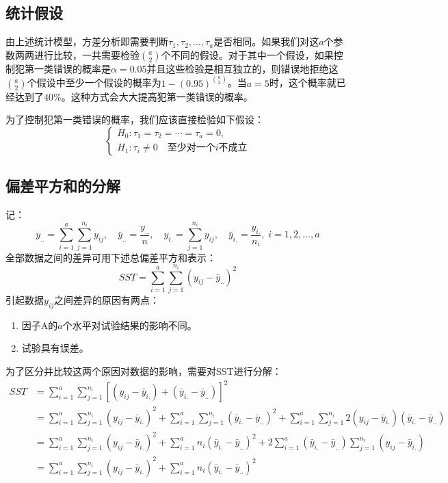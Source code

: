 \subsection{统计假设}\label{reason for multi-comparison}
由上述统计模型，方差分析即需要判断$\tau_1,\tau_2,\dots,\tau_a$是否相同。如果我们对这$a$个参数两两进行比较，一共需要检验$\binom{a}{2}$个不同的假设。对于其中一个假设，如果控制犯第一类错误的概率是$\alpha=0.05$并且这些检验是相互独立的，则错误地拒绝这$\binom{a}{2}$个假设中至少一个假设的概率为$1-(0.95)^\binom{a}{2}$。当$a=5$时，这个概率就已经达到了$40\%$。这种方式会大大提高犯第一类错误的概率。\par
为了控制犯第一类错误的概率，我们应该直接检验如下假设：
\begin{equation*}
	\begin{cases}
		H_0:\tau_1=\tau_2=\cdots=\tau_a=0, \\
		H_1:\tau_i\ne 0\quad\text{至少对一个$i$不成立}
	\end{cases}
\end{equation*}

\subsection{偏差平方和的分解}
记：
\begin{equation*}
	y_{..}=\sum_{i=1}^a\sum_{j=1}^{n_i}y_{ij},\quad\bar{y}_{..}=\frac{y_{..}}{n},\quad y_{i.}=\sum_{j=1}^{n_i}y_{ij},\quad \bar{y}_{i.}=\frac{y_{i.}}{n_i},\;i=1,2,\dots,a
\end{equation*}
全部数据之间的差异可用下述总偏差平方和表示：
\begin{equation*}
	SST=\sum_{i=1}^a\sum_{j=1}^{n_i}(y_{ij}-\bar{y}_{..})^2
\end{equation*}
引起数据$y_{ij}$之间差异的原因有两点：
\begin{enumerate}
	\item 因子A的$a$个水平对试验结果的影响不同。
	\item 试验具有误差。
\end{enumerate}
为了区分并比较这两个原因对数据的影响，需要对SST进行分解：
\begin{align*}
	SST
	&=\sum_{i=1}^a\sum_{j=1}^{n_i}\left[(y_{ij}-\bar{y}_{i.})+(\bar{y}_{i.}-\bar{y}_{..})\right]^2 \\
	&=\sum_{i=1}^a\sum_{j=1}^{n_i}(y_{ij}-\bar{y}_{i.})^2+\sum_{i=1}^a\sum_{j=1}^{n_i}(\bar{y}_{i.}-\bar{y}_{..})^2+\sum_{i=1}^a\sum_{j=1}^{n_i}2(y_{ij}-\bar{y}_{i.})(\bar{y}_{i.}-\bar{y}_{..}) \\
	&=\sum_{i=1}^a\sum_{j=1}^{n_i}(y_{ij}-\bar{y}_{i.})^2+\sum_{i=1}^an_i(\bar{y}_{i.}-\bar{y}_{..})^2+2\sum_{i=1}^a(\bar{y}_{i.}-\bar{y}_{..})\sum_{j=1}^{n_i}(y_{ij}-\bar{y}_{i.}) \\	&=\sum_{i=1}^a\sum_{j=1}^{n_i}(y_{ij}-\bar{y}_{i.})^2+\sum_{i=1}^an_i(\bar{y}_{i.}-\bar{y}_{..})^2
\end{align*}
